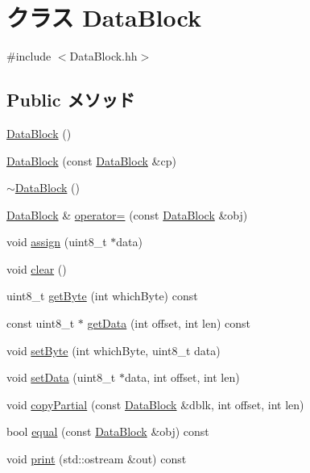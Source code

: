 \hypertarget{classDataBlock}{
\section{クラス DataBlock}
\label{classDataBlock}
}


{\ttfamily \#include $<$DataBlock.hh$>$}\subsection*{Public メソッド}
\begin{DoxyCompactItemize}
\item 
\hyperlink{classDataBlock_a70333aa76ea711881e05f285eb676414}{DataBlock} ()
\item 
\hyperlink{classDataBlock_a7d46edaeb847a8973610dc4d4ce6c6a2}{DataBlock} (const \hyperlink{classDataBlock}{DataBlock} \&cp)
\item 
\hyperlink{classDataBlock_a7bf0fa5f818d574e5d4d42b6a3f9e5f0}{$\sim$DataBlock} ()
\item 
\hyperlink{classDataBlock}{DataBlock} \& \hyperlink{classDataBlock_a5a3faa4c9900c71dca129d15aefd10dd}{operator=} (const \hyperlink{classDataBlock}{DataBlock} \&obj)
\item 
void \hyperlink{classDataBlock_a5f8b82315ac0fe6c029cea2ab249024a}{assign} (uint8\_\-t $\ast$data)
\item 
void \hyperlink{classDataBlock_ac8bb3912a3ce86b15842e79d0b421204}{clear} ()
\item 
uint8\_\-t \hyperlink{classDataBlock_a4cd8bb493e935c5c1907d2c92358bfaa}{getByte} (int whichByte) const 
\item 
const uint8\_\-t $\ast$ \hyperlink{classDataBlock_ad7715bb129ad4df13d1503d40dff368b}{getData} (int offset, int len) const 
\item 
void \hyperlink{classDataBlock_aebd25abdba7e6d75c7001647acbd204c}{setByte} (int whichByte, uint8\_\-t data)
\item 
void \hyperlink{classDataBlock_a2d3a78eb60f9589815df5d9d82a0faad}{setData} (uint8\_\-t $\ast$data, int offset, int len)
\item 
void \hyperlink{classDataBlock_a6ba9e3f9a391e9a177f270b59fe6f925}{copyPartial} (const \hyperlink{classDataBlock}{DataBlock} \&dblk, int offset, int len)
\item 
bool \hyperlink{classDataBlock_ae37d94507baba0d67be51551a08b2e67}{equal} (const \hyperlink{classDataBlock}{DataBlock} \&obj) const 
\item 
void \hyperlink{classDataBlock_ac55fe386a101fbae38c716067c9966a0}{print} (std::ostream \&out) const 
\end{DoxyCompactItemize}
